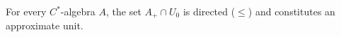 For every $C^*$-algebra $A$, the set $A_+ \cap U_0$ is directed ($\leq$) and constitutes an approximate unit.
